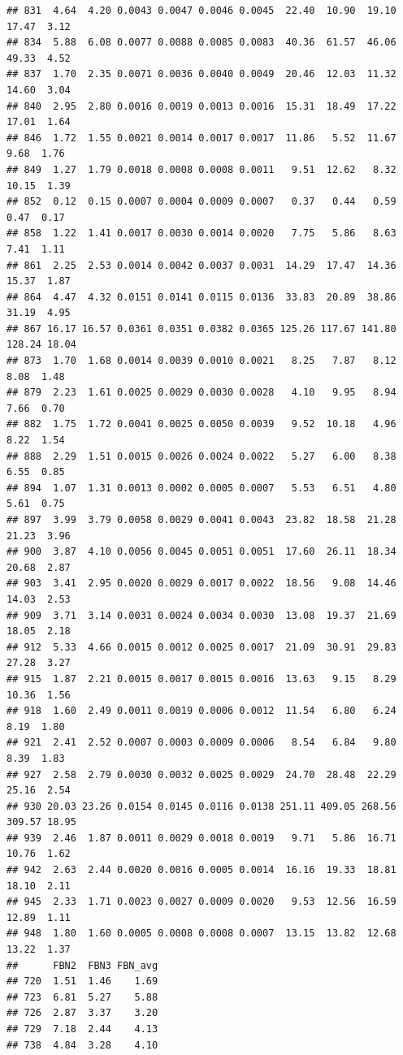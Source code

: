 \documentclass[]{article}
\begin{document}
\begin{verbatim}
## 831  4.64  4.20 0.0043 0.0047 0.0046 0.0045  22.40  10.90  19.10   17.47  3.12
## 834  5.88  6.08 0.0077 0.0088 0.0085 0.0083  40.36  61.57  46.06   49.33  4.52
## 837  1.70  2.35 0.0071 0.0036 0.0040 0.0049  20.46  12.03  11.32   14.60  3.04
## 840  2.95  2.80 0.0016 0.0019 0.0013 0.0016  15.31  18.49  17.22   17.01  1.64
## 846  1.72  1.55 0.0021 0.0014 0.0017 0.0017  11.86   5.52  11.67    9.68  1.76
## 849  1.27  1.79 0.0018 0.0008 0.0008 0.0011   9.51  12.62   8.32   10.15  1.39
## 852  0.12  0.15 0.0007 0.0004 0.0009 0.0007   0.37   0.44   0.59    0.47  0.17
## 858  1.22  1.41 0.0017 0.0030 0.0014 0.0020   7.75   5.86   8.63    7.41  1.11
## 861  2.25  2.53 0.0014 0.0042 0.0037 0.0031  14.29  17.47  14.36   15.37  1.87
## 864  4.47  4.32 0.0151 0.0141 0.0115 0.0136  33.83  20.89  38.86   31.19  4.95
## 867 16.17 16.57 0.0361 0.0351 0.0382 0.0365 125.26 117.67 141.80  128.24 18.04
## 873  1.70  1.68 0.0014 0.0039 0.0010 0.0021   8.25   7.87   8.12    8.08  1.48
## 879  2.23  1.61 0.0025 0.0029 0.0030 0.0028   4.10   9.95   8.94    7.66  0.70
## 882  1.75  1.72 0.0041 0.0025 0.0050 0.0039   9.52  10.18   4.96    8.22  1.54
## 888  2.29  1.51 0.0015 0.0026 0.0024 0.0022   5.27   6.00   8.38    6.55  0.85
## 894  1.07  1.31 0.0013 0.0002 0.0005 0.0007   5.53   6.51   4.80    5.61  0.75
## 897  3.99  3.79 0.0058 0.0029 0.0041 0.0043  23.82  18.58  21.28   21.23  3.96
## 900  3.87  4.10 0.0056 0.0045 0.0051 0.0051  17.60  26.11  18.34   20.68  2.87
## 903  3.41  2.95 0.0020 0.0029 0.0017 0.0022  18.56   9.08  14.46   14.03  2.53
## 909  3.71  3.14 0.0031 0.0024 0.0034 0.0030  13.08  19.37  21.69   18.05  2.18
## 912  5.33  4.66 0.0015 0.0012 0.0025 0.0017  21.09  30.91  29.83   27.28  3.27
## 915  1.87  2.21 0.0015 0.0017 0.0015 0.0016  13.63   9.15   8.29   10.36  1.56
## 918  1.60  2.49 0.0011 0.0019 0.0006 0.0012  11.54   6.80   6.24    8.19  1.80
## 921  2.41  2.52 0.0007 0.0003 0.0009 0.0006   8.54   6.84   9.80    8.39  1.83
## 927  2.58  2.79 0.0030 0.0032 0.0025 0.0029  24.70  28.48  22.29   25.16  2.54
## 930 20.03 23.26 0.0154 0.0145 0.0116 0.0138 251.11 409.05 268.56  309.57 18.95
## 939  2.46  1.87 0.0011 0.0029 0.0018 0.0019   9.71   5.86  16.71   10.76  1.62
## 942  2.63  2.44 0.0020 0.0016 0.0005 0.0014  16.16  19.33  18.81   18.10  2.11
## 945  2.33  1.71 0.0023 0.0027 0.0009 0.0020   9.53  12.56  16.59   12.89  1.11
## 948  1.80  1.60 0.0005 0.0008 0.0008 0.0007  13.15  13.82  12.68   13.22  1.37
##      FBN2  FBN3 FBN_avg
## 720  1.51  1.46    1.69
## 723  6.81  5.27    5.88
## 726  2.87  3.37    3.20
## 729  7.18  2.44    4.13
## 738  4.84  3.28    4.10

\end{verbatim}
\end{document}
